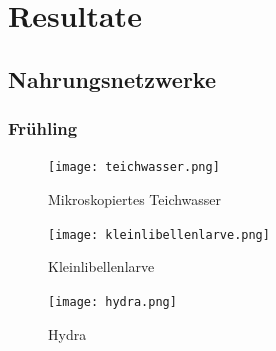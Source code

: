 \documentclass{article}
\begin{document}
        \clearpage


\section{Resultate}
    
    \subsection{Nahrungsnetzwerke}
        
    
        \subsubsection{Frühling}
            
            \begin{figure}[H]
            \centering
            \texttt{[image: teichwasser.png]}
            \caption{Mikroskopiertes Teichwasser}
            \label{fig:universe}
            \end{figure}
            
            \begin{figure}[H]
            \centering
            \texttt{[image: kleinlibellenlarve.png]}
            \caption{Kleinlibellenlarve}
            \label{fig:universe}
            \end{figure}
            
            \begin{figure}[h!]
            \centering
            \texttt{[image: hydra.png]}
            \caption{Hydra}
            \label{fig:universe}
            \end{figure}
            
            \newpage
            
\end{document}
